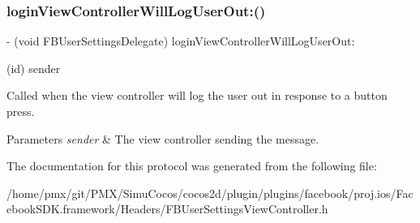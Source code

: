 \subsubsection{\texorpdfstring{login\+View\+Controller\+Will\+Log\+User\+Out\+:()}{loginViewControllerWillLogUserOut:()}\hspace{0.1cm}{\footnotesize\ttfamily [5/5]}}
{\footnotesize\ttfamily -\/ (void F\+B\+User\+Settings\+Delegate) login\+View\+Controller\+Will\+Log\+User\+Out\+: \begin{DoxyParamCaption}\item[{(id)}]{sender }\end{DoxyParamCaption}\hspace{0.3cm}{\ttfamily [optional]}}

Called when the view controller will log the user out in response to a button press.


\begin{DoxyParams}{Parameters}
{\em sender} & The view controller sending the message. \\
\hline
\end{DoxyParams}


The documentation for this protocol was generated from the following file\+:\begin{DoxyCompactItemize}
\item 
/home/pmx/git/\+P\+M\+X/\+Simu\+Cocos/cocos2d/plugin/plugins/facebook/proj.\+ios/\+Facebook\+S\+D\+K.\+framework/\+Headers/F\+B\+User\+Settings\+View\+Controller.\+h\end{DoxyCompactItemize}
